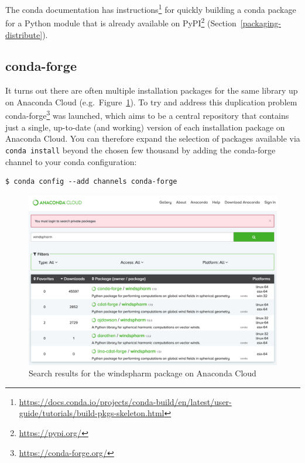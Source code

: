 \documentclass[
]{krantz}
\renewcommand{\href}[2]{#2\footnote{\url{#1}}}
\begin{document}
The conda documentation has \href{https://docs.conda.io/projects/conda-build/en/latest/user-guide/tutorials/build-pkgs-skeleton.html}{instructions} for quickly building
a conda package for a Python module that is already available on \href{https://pypi.org/}{PyPI}
(Section~\ref{packaging-distribute}).

\hypertarget{conda-forge}{%
\subsection{conda-forge}\label{conda-forge}}

It turns out there are often multiple installation packages for the same library
up on Anaconda Cloud (e.g.~Figure~\ref{fig:anaconda-windspharm-search}).
To try and address this duplication problem \href{https://conda-forge.org/}{conda-forge} was launched,
which aims to be a central repository that contains just a single, up-to-date (and working)
version of each installation package on Anaconda Cloud.
You can therefore expand the selection of packages available via \texttt{conda\ install}
beyond the chosen few thousand by adding the conda-forge channel to your conda configuration:

\begin{verbatim}
$ conda config --add channels conda-forge
\end{verbatim}

\begin{figure}

{\centering \includegraphics[width=1\linewidth]{figures/anaconda/cloud-windspharm-search} 

}

\caption{Search results for the windspharm package on Anaconda Cloud}\label{fig:anaconda-windspharm-search}
\end{figure}
\end{document}
